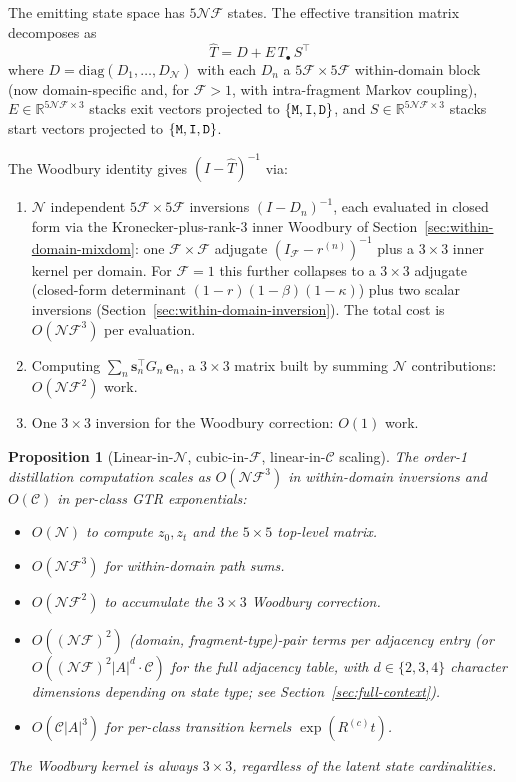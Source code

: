 \documentclass{article}
\newtheorem{proposition}{Proposition}
\newcommand\ext{r}
\newcommand\dom{n}
\newcommand\ndom{\mathcal{N}}
\newcommand\nfrag{\mathcal{F}}
\newcommand\alphabet{A}
\providecommand\revsub{R}
\newcommand\evoltime{t}
\newcommand\emptyseg{z}
\newcommand\nonemptytrans{T}
\newcommand\mat{{\tt M}}
\newcommand\ins{{\tt I}}
\newcommand\del{{\tt D}}
\newcommand\effT{\hat{T}}
\newcommand\class{c}
\newcommand\nclasses{\mathcal{C}}
\begin{document}
The emitting state space has $5\ndom\nfrag$ states.
The effective transition matrix decomposes as
\[
\effT = D + E\, \nonemptytrans_\bullet\, S^\top
\]
where $D = \text{diag}(D_1, \ldots, D_\ndom)$ with each $D_\dom$ a
$5\nfrag \times 5\nfrag$ within-domain block (now domain-specific and,
for $\nfrag > 1$, with intra-fragment Markov coupling),
$E \in \mathbb{R}^{5\ndom\nfrag \times 3}$ stacks exit vectors projected
to $\{\mat,\ins,\del\}$, and $S \in \mathbb{R}^{5\ndom\nfrag \times 3}$
stacks start vectors projected to $\{\mat,\ins,\del\}$.

The Woodbury identity gives $(I - \effT)^{-1}$ via:
\begin{enumerate}
\item $\ndom$ independent $5\nfrag \times 5\nfrag$ inversions
  $(I - D_\dom)^{-1}$, each evaluated in closed form via the
  Kronecker-plus-rank-3 inner Woodbury of
  Section~\ref{sec:within-domain-mixdom}: one $\nfrag \times \nfrag$
  adjugate $(I_\nfrag - \ext^{(\dom)})^{-1}$ plus a $3 \times 3$ inner
  kernel per domain. For $\nfrag = 1$ this further collapses to a
  $3\times 3$ adjugate (closed-form determinant
  $(1-\ext)(1-\beta)(1-\kappa)$) plus two scalar inversions
  (Section~\ref{sec:within-domain-inversion}). The total cost is
  $O(\ndom \nfrag^3)$ per evaluation.
\item Computing $\sum_\dom \mathbf{s}_\dom^\top G_\dom\, \mathbf{e}_\dom$,
  a $3 \times 3$ matrix built by summing $\ndom$ contributions:
  $O(\ndom \nfrag^2)$ work.
\item One $3 \times 3$ inversion for the Woodbury correction:
  $O(1)$ work.
\end{enumerate}

\begin{proposition}[Linear-in-$\ndom$, cubic-in-$\nfrag$, linear-in-$\nclasses$ scaling]
\label{prop:linear}
The order-1 distillation computation scales as $O(\ndom \nfrag^3)$
in within-domain inversions and $O(\nclasses)$ in per-class GTR
exponentials:
\begin{itemize}
\item $O(\ndom)$ to compute $\emptyseg_0, \emptyseg_\evoltime$ and the
  $5\times 5$ top-level matrix.
\item $O(\ndom \nfrag^3)$ for within-domain path sums.
\item $O(\ndom \nfrag^2)$ to accumulate the $3 \times 3$ Woodbury correction.
\item $O((\ndom\nfrag)^2)$ (domain, fragment-type)-pair terms per
  adjacency entry (or
  $O((\ndom\nfrag)^2 |\alphabet|^d \cdot \nclasses)$ for the full
  adjacency table, with $d \in \{2,3,4\}$ character dimensions
  depending on state type; see Section~\ref{sec:full-context}).
\item $O(\nclasses |\alphabet|^3)$ for per-class transition kernels
  $\exp(\revsub^{(\class)}\evoltime)$.
\end{itemize}
The Woodbury kernel is always $3 \times 3$, regardless of the latent
state cardinalities.
\end{proposition}
\end{document}

